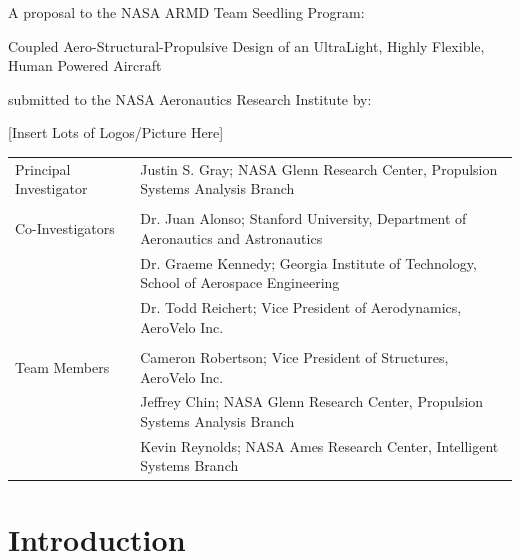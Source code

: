 \documentclass[]{aiaa-tc}
\begin{document}

  \vspace{4em}
  \begin{center}
    A proposal to the NASA ARMD Team Seedling Program: 
    \vspace{2em}

    {\Huge Coupled Aero­-Structural-Propulsive­ Design of an Ultra­Light, Highly Flexible, Human Powered Aircraft}

    \vspace{2em}
    submitted to the NASA Aeronautics Research Institute by: 

    \vspace{3em}
    [Insert Lots of Logos/Picture Here]
    \vspace{3em}


  \end{center}


  \begin{tabular}{l l}
    Principal Investigator & Justin S. Gray; NASA Glenn Research Center, Propulsion Systems Analysis Branch \\ 
    & \\
    Co-Investigators & Dr. Juan Alonso; Stanford University, Department of Aeronautics and Astronautics \\
                     & Dr. Graeme Kennedy; Georgia Institute of Technology, School of Aerospace Engineering \\ 
                     & Dr. Todd Reichert; Vice President of Aerodynamics, AeroVelo Inc. \\
    & \\ 
    Team Members & Cameron Robertson; Vice President of Structures, AeroVelo Inc. \\ 
                 & Jeffrey Chin; NASA Glenn Research Center, Propulsion Systems Analysis Branch \\
                 & Kevin Reynolds; NASA Ames Research Center, Intelligent Systems Branch \\
  \end{tabular}

  \newpage

  \section{Introduction}
\end{document}
